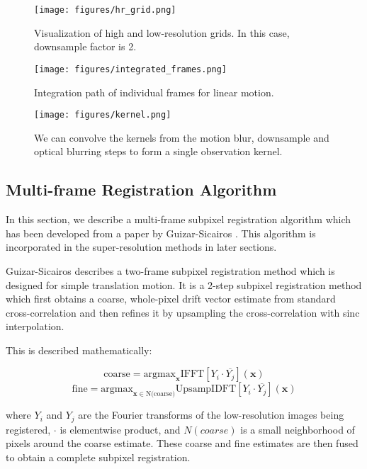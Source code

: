 \documentclass[10pt,twocolumn,letterpaper]{article}
\begin{document}
\begin{figure}[ht]
    \centering
    \texttt{[image: figures/hr\_grid.png]}
    \caption{Visualization of high and low-resolution grids.  In this case, downsample factor is 2.}
    \label{fig:hr_grid}
\end{figure}

\begin{figure}[ht]
    \centering
    \texttt{[image: figures/integrated\_frames.png]}
    \caption{Integration path of individual frames for linear motion.}
    \label{fig:integrated_frames}
\end{figure}

\begin{figure}[ht]
    \centering
    \texttt{[image: figures/kernel.png]}
    \caption{We can convolve the kernels from the motion blur, downsample and optical blurring steps to form a single observation kernel.}
    \label{fig:kernel}
\end{figure}

\subsection{Multi-frame Registration Algorithm}\label{sec:reg}

In this section, we describe a multi-frame subpixel registration algorithm which has been developed from a paper by Guizar-Sicairos \cite{guizar}.  This algorithm is incorporated in the super-resolution methods in later sections.

Guizar-Sicairos \cite{guizar} describes a two-frame subpixel registration method which is designed for simple translation motion.  It is a 2-step subpixel registration method which first obtains a coarse, whole-pixel drift vector estimate from standard cross-correlation and then refines it by upsampling the cross-correlation with sinc interpolation.

This is described mathematically:

$$\text{coarse} = \text{argmax}_\bm{x} \text{IFFT} \left[ Y_i \cdot \overline{Y_j} \right](\bm{x})$$
$$\text{fine} = \text{argmax}_{\bm{x} \in \text{N(coarse)}} \text{UpsampIDFT} \left[ Y_i \cdot \overline{Y_j} \right](\bm{x})$$

where $Y_i$ and $Y_j$ are the Fourier transforms of the low-resolution images being registered, $\cdot$ is elementwise product, and $N(coarse)$ is a small neighborhood of pixels around the coarse estimate.  These coarse and fine estimates are then fused to obtain a complete subpixel registration.
\end{document}

